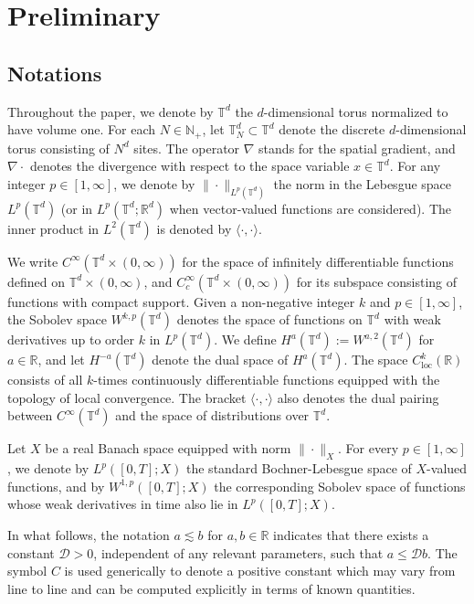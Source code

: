 \documentclass[UTF-8,reqno]{amsart}
\numberwithin{equation}{section}
\def\leq{\leqslant}
\def\leq{\leqslant}
\begin{document}
\section{Preliminary}\label{sec-2}
\subsection{Notations}
Throughout the paper, we denote by $\mathbb{T}^d$ the $d$-dimensional torus normalized to have volume one. For each $N \in \mathbb{N}_+$, let $\mathbb{T}^d_N\subset\mathbb{T}^d$ denote the discrete $d$-dimensional torus consisting of $N^d$ sites. The operator $\nabla$ stands for the spatial gradient, and $\nabla\cdot$ denotes the divergence with respect to the space variable $x \in \mathbb{T}^d$. For any integer $p \in [1,\infty]$, we denote by $\|\cdot\|_{L^p(\mathbb{T}^d)}$ the norm in the Lebesgue space $L^p(\mathbb{T}^d)$ (or in $L^p(\mathbb{T}^d; \mathbb{R}^d)$ when vector-valued functions are considered). The inner product in $L^2(\mathbb{T}^d)$ is denoted by $\langle\cdot,\cdot\rangle$. 

We write $C^\infty(\mathbb{T}^d \times (0,\infty))$ for the space of infinitely differentiable functions defined on $\mathbb{T}^d \times (0,\infty)$, and $C^\infty_c(\mathbb{T}^d \times (0,\infty))$ for its subspace consisting of functions with compact support. Given a non-negative integer $k$ and $p \in [1,\infty]$, the Sobolev space $W^{k,p}(\mathbb{T}^d)$ denotes the space of functions on $\mathbb{T}^d$ with weak derivatives up to order $k$ in $L^p(\mathbb{T}^d)$. We define $H^a(\mathbb{T}^d) := W^{a,2}(\mathbb{T}^d)$ for $a \in \mathbb{R}$, and let $H^{-a}(\mathbb{T}^d)$ denote the dual space of $H^a(\mathbb{T}^d)$. The space $C^k_{\mathrm{loc}}(\mathbb{R})$ consists of all $k$-times continuously differentiable functions equipped with the topology of local convergence. The bracket $\langle\cdot,\cdot\rangle$ also denotes the dual pairing between $C^\infty(\mathbb{T}^d)$ and the space of distributions over $\mathbb{T}^d$.

Let $X$ be a real Banach space equipped with norm $\|\cdot\|_X$. For every $p \in [1,\infty]$, we denote by $L^p([0,T];X)$ the standard Bochner-Lebesgue space of $X$-valued functions, and by $W^{1,p}([0,T];X)$ the corresponding Sobolev space of functions whose weak derivatives in time also lie in $L^p([0,T];X)$.

In what follows, the notation $a \lesssim b$ for $a, b \in \mathbb{R}$ indicates that there exists a constant $\mathcal{D} > 0$, independent of any relevant parameters, such that $a \leq \mathcal{D}b$. The symbol $C$ is used generically to denote a positive constant which may vary from line to line and can be computed explicitly in terms of known quantities. 
\end{document}

